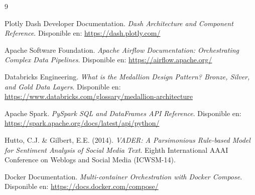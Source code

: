 \documentclass[12pt, a4paper]{article}
\begin{document}
\begin{thebibliography}{9}

Plotly Dash Developer Documentation. 
\textit{Dash Architecture and Component Reference}. 
Disponible en: \url{https://dash.plotly.com/}

Apache Software Foundation. 
\textit{Apache Airflow Documentation: Orchestrating Complex Data Pipelines}. 
Disponible en: \url{https://airflow.apache.org/}

Databricks Engineering. 
\textit{What is the Medallion Design Pattern? Bronze, Silver, and Gold Data Layers}. 
Disponible en: \url{https://www.databricks.com/glossary/medallion-architecture}

Apache Spark. 
\textit{PySpark SQL and DataFrames API Reference}. 
Disponible en: \url{https://spark.apache.org/docs/latest/api/python/}

Hutto, C.J. \& Gilbert, E.E. (2014). 
\textit{VADER: A Parsimonious Rule-based Model for Sentiment Analysis of Social Media Text}. 
Eighth International AAAI Conference on Weblogs and Social Media (ICWSM-14).

Docker Documentation. 
\textit{Multi-container Orchestration with Docker Compose}. 
Disponible en: \url{https://docs.docker.com/compose/}

\end{thebibliography}
\end{document}

